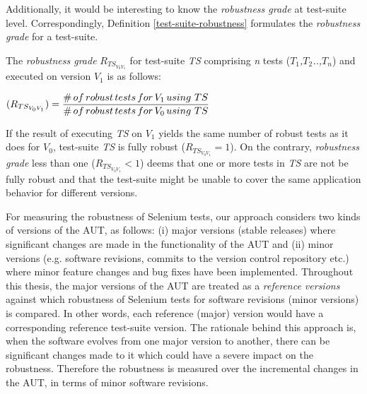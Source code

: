 Additionally, it would be interesting to know the \textit{
robustness grade} at test-suite level. Correspondingly, Definition \ref{test-suite-robustness} formulates the \textit{
robustness grade} for a test-suite.

\theoremstyle{definition}
\begin{definition}{The \textit{robustness grade} $R_{TS_{V_{0}V_{1}}}$ for test-suite \textit{TS} comprising \textit{n} tests (\textit{$T_1$,$T_2$..,$T_n$}) and executed on version \textit{$V_{1}$} is as follows:}
\vspace{0.5cm}
\begin{center}
$(R_{TS_{V_{0}V_{1}}}) = \displaystyle \frac{\#\thinspace of \thinspace robust \thinspace tests \thinspace for \thinspace V_{1} \thinspace using \thinspace \thinspace TS}{\# \thinspace of \thinspace robust \thinspace tests \thinspace for  \thinspace V_{0} \thinspace using \thinspace \thinspace TS}$ \normalsize
\end{center}
\label{test-suite-robustness}
\end{definition}

If the result of executing \textit{TS} on \textit{$V_{1}$} yields the same number of robust tests as it does for \textit{$V_{0}$}, test-suite \textit{TS} is fully robust ($R_{TS_{V_{0}V_{1}}} =1$). On the contrary, \textit{
robustness grade} less than one ($R_{TS_{V_{0}V_{1}}} < 1$) deems that one or more tests in \textit{TS} are not be fully robust and that the test-suite might be unable to cover the same application behavior for different versions. 

For measuring the robustness of Selenium tests, our approach considers two kinds of versions of the AUT, as follows: (i) major versions (stable releases) where significant changes are made in the functionality of the AUT and (ii) minor versions (e.g. software revisions, commits to the version control repository etc.) where minor feature changes and bug fixes have been implemented. Throughout this thesis, the major versions of the AUT are treated as a \textit{reference versions} against which robustness of Selenium tests for software revisions (minor versions) is compared. In other words, each reference (major) version would have a corresponding reference test-suite version. The rationale behind this approach is, when the software evolves from one major version to another, there can be significant changes made to it which could have a severe impact on the robustness. Therefore the robustness is measured over the incremental changes in the AUT, in terms of minor software revisions.  

